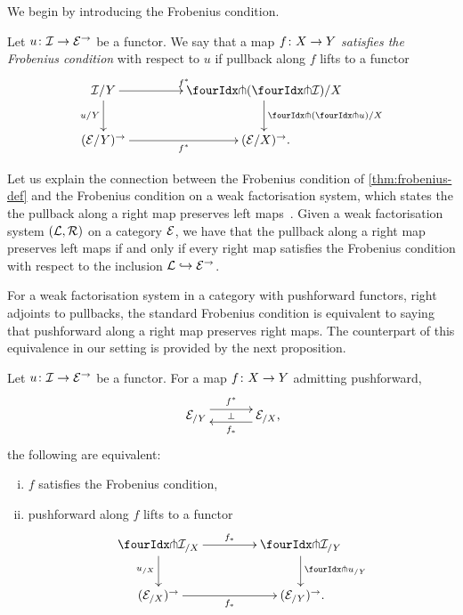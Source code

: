 \documentclass[reqno,10pt,a4paper,oneside,draft]{amsart}
\begin{document}
\medskip

We begin by introducing the Frobenius condition.

\begin{definition} \label{thm:frobenius-def}
Let $u \co \cal{I} \to \cal{E}^\to$ be a functor.
We say that a map $f \co X \to Y$ \emph{satisfies the Frobenius condition} with respect to $u$ if pullback along $f$ lifts to a functor
\[
\xymatrix@C=1.5cm{
  \cal{I}/Y
  \ar[r]^{f^*}
  \ar[d]_{u/Y}
&
  \liftl{ ( \liftr{\cal{I}} )}/X
  \ar[d]^{\liftl{(\liftr{u})/X}}
\\
  (\catE/Y)^\to \ar[r]_{f^*}
&
  (\catE/X)^\to \rlap{.}
}
\]
\end{definition}

Let us explain the connection between the Frobenius condition of \cref{thm:frobenius-def} and the Frobenius condition on 
a weak factorisation system, which states the the pullback along a right map preserves left 
maps~\cite{garner:types-omega-groupoids,garner:topological-simplicial}. Given a  weak
factorisation system $(\cal{L}, \cal{R})$ on a category $\catE$,  we have that the pullback along a right map preserves left 
maps if and only if every right map satisfies the Frobenius condition with respect to the inclusion $\cal{L} \hookrightarrow
\cal{E}^\to$. 

\medskip

For a weak factorisation system in a category with pushforward functors, \ie right adjoints to pullbacks,
the standard Frobenius condition is equivalent to saying that pushforward along a right map preserves right maps.
The counterpart of this equivalence in our setting is provided by the next proposition.



\begin{proposition} \label{lift-dependent-product}
Let $u \co \cal{I} \to \cal{E}^\to$ be a functor.
For a map $f \co X \to Y$ admitting pushforward,
\[
\xymatrix@C+1em{
  \catE_{/Y}
  \ar@<5pt>[r]^{f^*}
  \ar@{}[r]|{\bot}
&
  \catE_{/X}
  \ar@<5pt>[l]^{f_*} \rlap{,}
}
\]
the following are equivalent:
\begin{enumerate}[(i)]
\item $f$ satisfies the Frobenius condition,
\item pushforward along $f$ lifts to a functor
\[
\xymatrix@C=1.5cm{
  \liftr{\cal{I}}_{/X}
  \ar[r]^{f_*}
  \ar[d]_{u_{/X}}
&
  \liftr{\cal{I}}_{/Y}
  \ar[d]^{\liftr{u}_{/Y}}
\\
  (\catE_{/X})^\to
  \ar[r]_{f_*}
&
  (\catE_{/Y})^\to \rlap{.}
}
\]

\end{enumerate}
\end{proposition}
\end{document}
